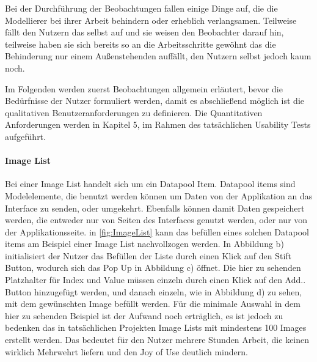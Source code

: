 Bei der Durchführung der Beobachtungen fallen einige Dinge auf, die die Modellierer bei ihrer Arbeit behindern oder erheblich verlangsamen.
Teilweise fällt den Nutzern das selbst auf und sie weisen den Beobachter darauf hin, teilweise haben sie sich bereits so an die Arbeitsschritte gewöhnt das die Behinderung nur einem Außenstehenden auffällt, den Nutzern selbst jedoch kaum noch.

Im Folgenden werden zuerst Beobachtungen allgemein erläutert, bevor die Bedürfnisse der Nutzer formuliert werden, damit es abschließend möglich ist die qualitativen Benutzeranforderungen zu definieren.
Die Quantitativen Anforderungen werden in Kapitel 5, im Rahmen des tatsächlichen Usability Tests aufgeführt.

\paragraph{Image List}
Bei einer Image List handelt sich um ein Datapool Item. 
Datapool items sind Modelelemente, die benutzt werden können um Daten von der Applikation an das Interface zu senden, oder umgekehrt.
Ebenfalls können damit Daten gespeichert werden, die entweder nur von Seiten des Interfaces genutzt werden, oder nur von der Applikationsseite.\cite{studio_guide}
in \cref{fig:ImageList} kann das befüllen eines solchen Datapool items am Beispiel einer Image List nachvollzogen werden.
In Abbildung b) initialisiert der Nutzer das Befüllen der Liste durch einen Klick auf den \glqq Stift\grqq{} Button, wodurch sich das Pop Up in Abbildung c) öffnet.
Die hier zu sehenden Platzhalter für Index und Value müssen einzeln durch einen Klick auf den \glqq Add..\grqq{} Button hinzugefügt werden, und danach einzeln, wie in Abbildung d) zu sehen, mit dem gewünschten Image befüllt werden.
Für die minimale Auswahl in dem hier zu sehenden Beispiel ist der Aufwand noch erträglich, es ist jedoch zu bedenken das in tatsächlichen Projekten Image Lists mit mindestens 100 Images erstellt werden.
Das bedeutet für den Nutzer mehrere Stunden Arbeit, die keinen wirklich Mehrwehrt liefern und den Joy of Use deutlich mindern.


